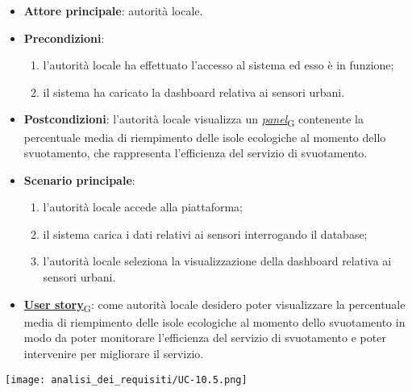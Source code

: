 \begin{itemize}
	\item \textbf{Attore principale}: autorità locale.
	\item \textbf{Precondizioni}:
	      \begin{enumerate}
		      \item l'autorità locale ha effettuato l'accesso al sistema ed esso è in funzione;
		      \item il sistema ha caricato la dashboard relativa ai sensori urbani.
	      \end{enumerate}
	\item \textbf{Postcondizioni}: l'autorità locale visualizza un \href{https://7last.github.io/docs/pb/documentazione-interna/glossario\#panel}{\textit{panel}\textsubscript{G}} contenente la percentuale media di riempimento delle isole ecologiche al momento dello svuotamento,
	      che rappresenta l'efficienza del servizio di svuotamento.
	\item \textbf{Scenario principale}:
	      \begin{enumerate}
		      \item l'autorità locale accede alla piattaforma;
		      \item il sistema carica i dati relativi ai sensori interrogando il database;
		      \item l'autorità locale seleziona la visualizzazione della dashboard relativa ai sensori urbani.
	      \end{enumerate}
	\item \href{https://7last.github.io/docs/pb/documentazione-interna/glossario\#user-story}{\textbf{User story}\textsubscript{G}}:
	      come autorità locale desidero poter visualizzare la percentuale media di riempimento delle isole ecologiche al momento dello svuotamento in modo da poter monitorare
	      l'efficienza del servizio di svuotamento e poter intervenire per migliorare il servizio.
\end{itemize}
\begin{center}
	\texttt{[image: analisi\_dei\_requisiti/UC-10.5.png]}
\end{center}

